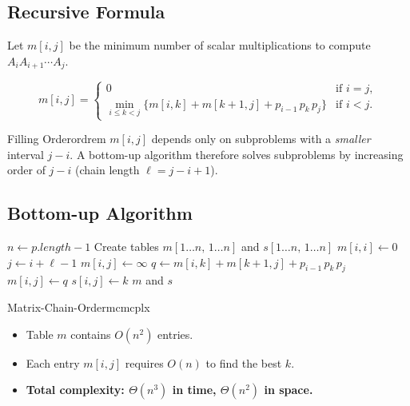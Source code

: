 \subsection{Recursive Formula}

Let $m[i, j]$ be the minimum number of scalar multiplications to compute
$A_i A_{i+1} \cdots A_j$.

\[
  m[i, j] =
  \begin{cases}
    0 & \text{if } i = j, \\
    \displaystyle\min_{i \le k < j}
      \bigl\{ m[i,k] + m[k+1,j] + p_{i-1}\, p_k\, p_j \bigr\}
    & \text{if } i < j.
  \end{cases}
\]

\begin{remark}{Filling Order}{ordrem}
$m[i, j]$ depends only on subproblems with a \emph{smaller} interval $j - i$.
A bottom-up algorithm therefore solves subproblems by increasing order of $j - i$
(chain length $\ell = j - i + 1$).
\end{remark}

\subsection{Bottom-up Algorithm}

\begin{algorithm}[H]
\caption{Matrix-Chain-Order($p$)}
\begin{algorithmic}[1]
\State $n \leftarrow p.\mathit{length} - 1$
\State Create tables $m[1\ldots n,\, 1\ldots n]$ and $s[1\ldots n,\, 1\ldots n]$
    \State $m[i, i] \leftarrow 0$
\EndFor
{}                  
        \State $j \leftarrow i + \ell - 1$
        \State $m[i, j] \leftarrow \infty$
            \State $q \leftarrow m[i,k] + m[k+1,j] + p_{i-1}\, p_k\, p_j$
                \State $m[i,j] \leftarrow q$
                \State $s[i,j] \leftarrow k$    
            \EndIf
        \EndFor
    \EndFor
\EndFor
\State \Return $m$ and $s$
\end{algorithmic}
\end{algorithm}

\begin{complexity}{Matrix-Chain-Order}{mcmcplx}
\begin{itemize}[noitemsep]
  \item Table $m$ contains $O(n^2)$ entries.
  \item Each entry $m[i,j]$ requires $O(n)$ to find the best $k$.
  \item \textbf{Total complexity: $\Theta(n^3)$ in time, $\Theta(n^2)$ in space.}
\end{itemize}
\end{complexity}


